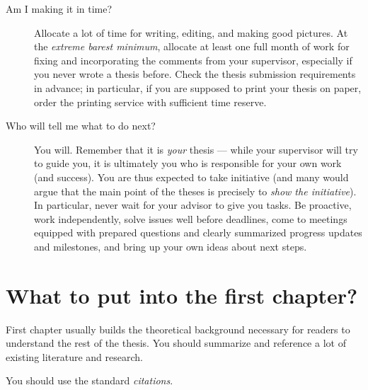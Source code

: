 \begin{description}
\item[Am I making it in time?]
Allocate a lot of time for writing, editing, and making good pictures. At the \emph{extreme barest minimum}, allocate at least one full month of work for fixing and incorporating the comments from your supervisor, especially if you never wrote a thesis before. Check the thesis submission requirements in advance; in particular, if you are supposed to print your thesis on paper, order the printing service with sufficient time reserve.
\item[Who will tell me what to do next?]
You will. Remember that it is \emph{your} thesis --- while your supervisor will try to guide you, it is ultimately you who is responsible for your own work (and success). You are thus expected to take initiative (and many would argue that the main point of the theses is precisely to \emph{show the initiative}). In particular, never wait for your advisor to give you tasks. Be proactive, work independently, solve issues well before deadlines, come to meetings equipped with prepared questions and clearly summarized progress updates and milestones, and bring up your own ideas about next steps.
\end{description}

\section{What to put into the first chapter?}

First chapter usually builds the theoretical background necessary for readers to understand the rest of the thesis. You should summarize and reference a lot of existing literature and research.

You should use the standard \emph{citations}.

